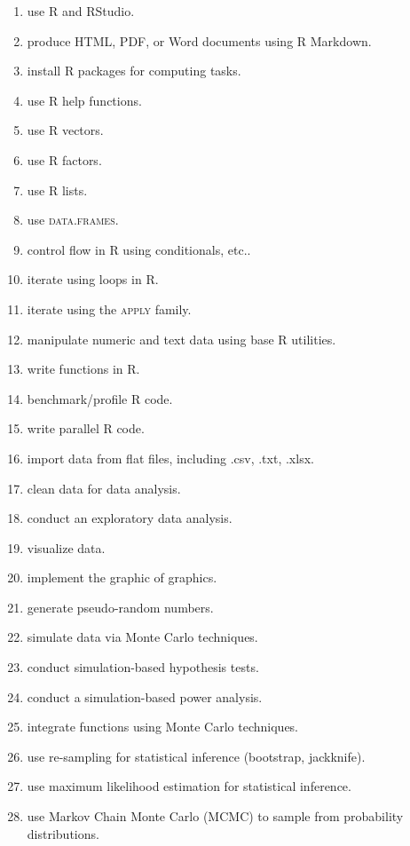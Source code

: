 \documentclass[11pt,onecolumn]{article}
\begin{document}
\begin{enumerate}
  \itemsep0em 
\item use R and RStudio.
\item produce HTML, PDF, or Word documents using R Markdown.
\item install R packages for computing tasks.
\item use R help functions.
\item use R vectors.
\item use R factors.
\item use R lists.
\item use \textsc{data.frames}.
\item control flow in R using conditionals, etc..
\item iterate using loops in R.
\item iterate using the \textsc{apply} family.
\item manipulate numeric and text data using base R utilities.
\item write functions in R.
\item benchmark/profile R code.
\item write parallel R code.
\item import data from flat files, including .csv, .txt, .xlsx.
\item clean data for data analysis.
\item conduct an exploratory data analysis.
\item visualize data.
\item implement the graphic of graphics.
\item generate pseudo-random numbers.
\item simulate data via Monte Carlo techniques.
\item conduct simulation-based hypothesis tests.
\item conduct a simulation-based power analysis.
\item integrate functions using Monte Carlo techniques.
\item use re-sampling for statistical inference (bootstrap, jackknife).
\item use maximum likelihood estimation for statistical inference.
\item use Markov Chain Monte Carlo (MCMC) to sample from probability distributions.
\end{enumerate}
\end{document}
